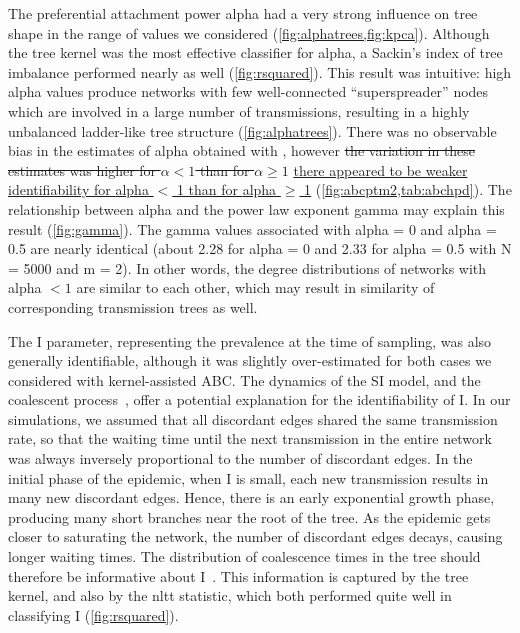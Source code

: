 The preferential attachment power \gls{alpha} had a very strong influence on
tree shape in the range of values we considered
(\cref{fig:alphatrees,fig:kpca}). Although the tree kernel was the most
effective classifier for \gls{alpha}, a Sackin's index of tree imbalance
performed nearly as well (\cref{fig:rsquared}). This result was intuitive: high
\gls{alpha} values produce networks with few well-connected ``superspreader''
nodes which are involved in a large number of transmissions, resulting in a
highly unbalanced ladder-like tree structure (\cref{fig:alphatrees}). 
There was no observable bias in the estimates of \gls{alpha} obtained with
, however {\color{red}\sout{the variation in these estimates
was higher for $\alpha < 1$ than for $\alpha \geq 1$}} {\color{blue}\uline{there
appeared to be weaker identifiability for \gls{alpha} $<$ 1 than for \gls{alpha}
$\geq$ 1}} (\cref{fig:abcptm2,tab:abchpd}). The relationship between
\gls{alpha} and the power law exponent \gls{gamma} may explain this result
(\cref{fig:gamma}). The \gls{gamma} values associated with \gls{alpha} = 0 and
\gls{alpha} = 0.5 are nearly identical (about 2.28 for \gls{alpha} = 0 and 2.33
for \gls{alpha} = 0.5 with \gls{N} = 5000 and \gls{m} = 2). In other words, the
degree distributions of networks with \gls{alpha} $< 1$ are similar to each
other, which may result in similarity of corresponding transmission trees as
well. 

The \gls{I} parameter, representing the prevalence at the time of sampling, was
also generally identifiable, although it was slightly over-estimated for both
cases we considered with kernel-assisted \gls{ABC}. The dynamics of the \gls{SI} model,
and the coalescent process~\autocite{kingman1982coalescent}, offer a potential
explanation for the identifiability of \gls{I}. In our simulations, we assumed
that all discordant edges shared the same transmission rate, so that the
waiting time until the next transmission in the entire network was always
inversely proportional to the number of discordant edges. In the initial phase
of the epidemic, when \gls{I} is small, each new transmission results in many
new discordant edges. Hence, there is an early exponential growth phase,
producing many short branches near the root of the tree. As the epidemic gets
closer to saturating the network, the number of discordant edges decays,
causing longer waiting times. The distribution of coalescence times in the tree
should therefore be informative about \gls{I}~\autocite{volz2009phylodynamics}.
This information is captured by the tree kernel, and also by the \gls{nltt}
statistic, which both performed quite well in classifying \gls{I}
(\cref{fig:rsquared}). 

